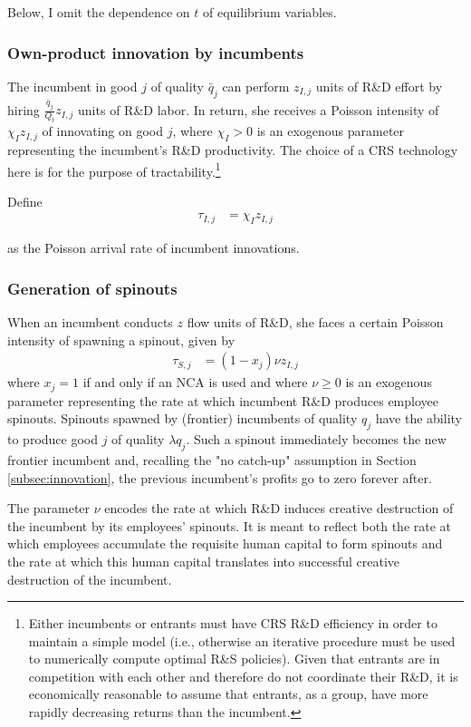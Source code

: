 \documentclass[11pt,english]{article}
\theoremstyle{remark}
\begin{document}
 
Below, I omit the dependence on $t$ of equilibrium variables. 

\subsubsection{Own-product innovation by incumbents} \label{subsubsec:OI}

The incumbent in good $j$ of quality $\bar{q}_{j}$ can perform $z_{I,j}$ units of R\&D effort by hiring $\frac{\bar{q}_{j}}{Q_t}z_{I,j}$ units of R\&D labor. In return, she receives a Poisson intensity of $\chi_I z_{I,j}$ of innovating on good $j$, where $\chi_I > 0$ is an exogenous parameter representing the incumbent's R\&D productivity. The choice of a CRS technology here is for the purpose of tractability.\footnote{Either incumbents or entrants must have CRS R\&D efficiency in order to maintain a simple model (i.e., otherwise an iterative procedure must be used to numerically compute optimal R\&S policies). Given that entrants are in competition with each other and therefore do not coordinate their R\&D, it is economically reasonable to assume that entrants, as a group, have more rapidly decreasing returns than the incumbent.}

Define
\begin{align}
	\tau_{I,j} &= \chi_I z_{I,j}
\end{align}

as the Poisson arrival rate of incumbent innovations.

\subsubsection{Generation of spinouts}

When an incumbent conducts $z$ flow units of R\&D, she faces a certain Poisson intensity of spawning a spinout, given by 
\begin{align*}
	\tau_{S,j} &= (1-x_{j}) \nu z_{I,j}
\end{align*} 
where $x_{j} = 1$ if and only if an NCA is used and where $\nu \ge 0$ is an exogenous parameter representing the rate at which incumbent R\&D produces employee spinouts. Spinouts spawned by (frontier) incumbents of quality $q_j$ have the ability to produce good $j$ of quality $\lambda q_j$. Such a spinout immediately becomes the new frontier incumbent and, recalling the "no catch-up" assumption in Section \ref{subsec:innovation}, the previous incumbent's profits go to zero forever after.

The parameter $\nu$ encodes the rate at which R\&D induces creative destruction of the incumbent by its employees' spinouts. It is meant to reflect both the rate at which employees accumulate the requisite human capital to form spinouts and the rate at which this human capital translates into successful creative destruction of the incumbent.
\end{document}
